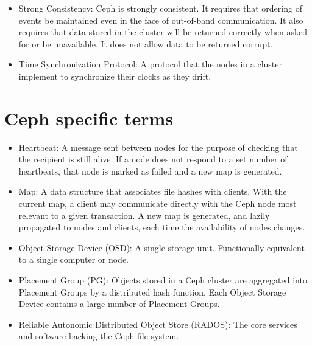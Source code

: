 \begin{itemize}
\item Strong Consistency: Ceph is strongly consistent. It requires
  that ordering of events be maintained even in the face of
  out-of-band communication. It also requires that data stored in the
  cluster will be returned correctly when asked for or be
  unavailable. It does not allow data to be returned corrupt.

\item Time Synchronization Protocol: A protocol that the nodes in a
  cluster implement to synchronize their clocks as they drift.


  
\end{itemize}

\section{Ceph specific terms}

\begin{itemize}

\item Heartbeat: A message sent between nodes for the purpose of
  checking that the recipient is still alive. If a node does not
  respond to a set number of heartbeats, that node is marked as failed
  and a new map is generated.

\item Map: A data structure that associates file hashes with
  clients. With the current map, a client may communicate directly
  with the Ceph node most relevant to a given transaction. A new map
  is generated, and lazily propagated to nodes and clients, each time
  the availability of nodes changes.
  	
\item Object Storage Device (OSD): A single storage unit. Functionally
  equivalent to a single computer or node.

\item Placement Group (PG): Objects stored in a Ceph cluster are
  aggregated into Placement Groups by a distributed hash
  function. Each Object Storage Device contains a large number of
  Placement Groups.
   
\item Reliable Autonomic Distributed Object Store (RADOS): The core
  services and software backing the Ceph file system.

\end{itemize}

